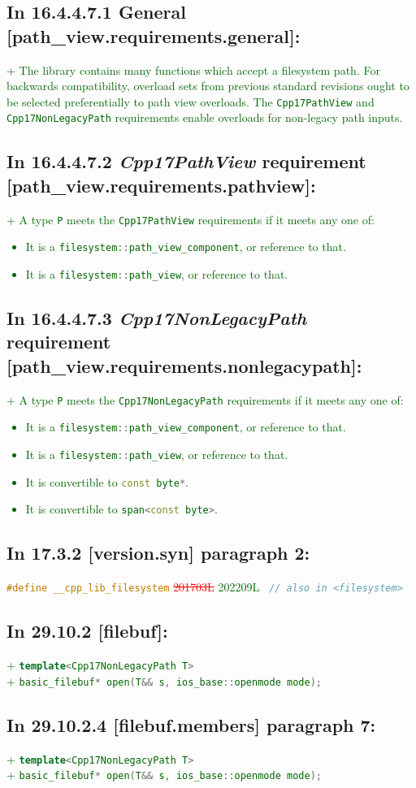 \documentclass[11pt]{article}
\newcommand{\code}[2][cpp]{\lstinline[language=#1,basicstyle=\small\ttfamily]{#2}}
\newcommand{\tsrefp}[3]{\subsection*{In #2 \textbf{[#1]} paragraph #3:}}
\newcommand{\tsref}[2]{\subsection*{In #2 \textbf{[#1]}:}}
\newcommand{\tsrefz}[1]{\subsection*{In #1:}}
\newcommand{\tsreplace}[3]{\textcolor{red}{\sout{#1}}#2\textcolor{darkgreen}{#3}}
\begin{document}
\tsrefz{16.4.4.7.1 General [path\_view.requirements.general]}

\tsreplace{}{}{+ The library contains many functions which accept a filesystem path. For backwards compatibility, overload sets from previous standard revisions ought to be selected preferentially to path view overloads. The \code{Cpp17PathView} and \code{Cpp17NonLegacyPath} requirements enable overloads for non-legacy path inputs.}

\tsrefz{16.4.4.7.2 \emph{Cpp17PathView} requirement [path\_view.requirements.pathview]}

\tsreplace{}{}{+ A type \code{P} meets the \code{Cpp17PathView} requirements if it meets any one of:
\begin{itemize}
    \item It is a \code{filesystem::path_view_component}, or reference to that.
    \item It is a \code{filesystem::path_view}, or reference to that.
\end{itemize}}

\tsrefz{16.4.4.7.3 \emph{Cpp17NonLegacyPath} requirement [path\_view.requirements.nonlegacypath]}

\tsreplace{}{}{+ A type \code{P} meets the \code{Cpp17NonLegacyPath} requirements if it meets any one of:
\begin{itemize}
    \item It is a \code{filesystem::path_view_component}, or reference to that.
    \item It is a \code{filesystem::path_view}, or reference to that.
    \item It is convertible to \code{const byte*}.
    \item It is convertible to \code{span<const byte>}.
\end{itemize}}

\tsrefp{version.syn}{17.3.2}{2}

\code{#define __cpp_lib_filesystem}
\tsreplace{201703L}{ }{202209L}
\code{ // also in <filesystem>}

\tsref{filebuf}{29.10.2}

\tsreplace{}{}{+ \code{template<Cpp17NonLegacyPath T>}}\\
\tsreplace{}{}{+ \code{basic_filebuf* open(T&& s, ios_base::openmode mode);}}

\tsrefp{filebuf.members}{29.10.2.4}{7}

\tsreplace{}{}{+ \code{template<Cpp17NonLegacyPath T>}}\\
\tsreplace{}{}{+ \code{basic_filebuf* open(T&& s, ios_base::openmode mode);}}
\end{document}
